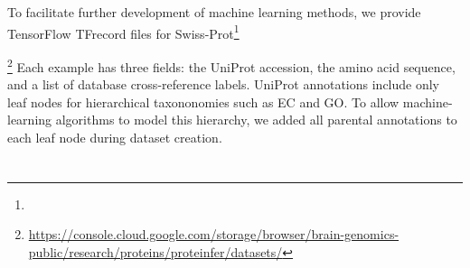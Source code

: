 To facilitate further development of machine learning methods, we provide TensorFlow \citep{abadi2016tensorflow} TFrecord files for Swiss-Prot\DIFdelbegin \footnote{%
}%
\addtocounter{footnote}{-1}%
\DIFdelend \DIFaddbegin {}\footnote{\url{https://console.cloud.google.com/storage/browser/brain-genomics-public/research/proteins/proteinfer/datasets/}} \DIFaddend Each example has three fields: the UniProt accession, the amino acid sequence, and a list of database cross-reference labels. UniProt annotations include only leaf nodes for hierarchical taxononomies such as EC and GO. To allow machine-learning algorithms to model this hierarchy, we added all parental annotations to each leaf node during dataset creation. 
\DIFdelbegin \section*{}
\DIFdelend \DIFaddbegin 

